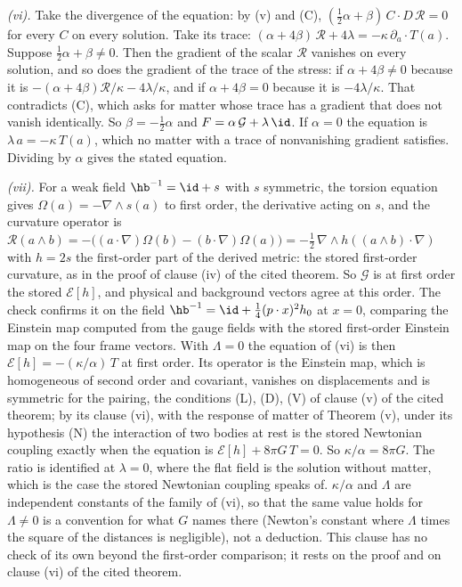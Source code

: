 \emph{(vi).} Take the divergence of the equation: by (v) and (C), $(\tfrac12\alpha + \beta)\,C \cdot D\,\mathcal{R} = 0$ for every $C$ on every solution. Take its trace: $(\alpha + 4\beta)\,\mathcal{R} + 4\lambda = -\kappa\,\partial_{a} \cdot T(a)$. Suppose $\tfrac12\alpha + \beta \neq 0$. Then the gradient of the scalar $\mathcal{R}$ vanishes on every solution, and so does the gradient of the trace of the stress: if $\alpha + 4\beta \neq 0$ because it is $-(\alpha + 4\beta)\mathcal{R}/\kappa - 4\lambda/\kappa$, and if $\alpha + 4\beta = 0$ because it is $-4\lambda/\kappa$. That contradicts (C), which asks for matter whose trace has a gradient that does not vanish identically. So $\beta = -\tfrac12\alpha$ and $F = \alpha\,\mathcal{G} + \lambda\,\id$. If $\alpha = 0$ the equation is $\lambda\,a = -\kappa\,T(a)$, which no matter with a trace of nonvanishing gradient satisfies. Dividing by $\alpha$ gives the stated equation.

\emph{(vii).} For a weak field $\hb^{-1} = \id + s$ with $s$ symmetric, the torsion equation gives $\Omega(a) = -\nabla \wedge s(a)$ to first order, the derivative acting on $s$, and the curvature operator is $\mathcal{R}(a \wedge b) = -\bigl((a \cdot \nabla)\Omega(b) - (b \cdot \nabla)\Omega(a)\bigr) = -\tfrac12\,\nabla \wedge h((a \wedge b) \cdot \nabla)$ with $h = 2s$ the first-order part of the derived metric: the stored first-order curvature, as in the proof of clause (iv) of the cited theorem. So $\mathcal{G}$ is at first order the stored $\mathcal{E}[h]$, and physical and background vectors agree at this order. The check confirms it on the field $\hb^{-1} = \id + \tfrac14(p \cdot x)^{2}h_{0}$ at $x = 0$, comparing the Einstein map computed from the gauge fields with the stored first-order Einstein map on the four frame vectors. With $\Lambda = 0$ the equation of (vi) is then $\mathcal{E}[h] = -(\kappa/\alpha)\,T$ at first order. Its operator is the Einstein map, which is homogeneous of second order and covariant, vanishes on displacements and is symmetric for the pairing, the conditions (L), (D), (V) of clause (v) of the cited theorem; by its clause (vi), with the response of matter of Theorem (v), under its hypothesis (N) the interaction of two bodies at rest is the stored Newtonian coupling exactly when the equation is $\mathcal{E}[h] + 8\pi G\,T = 0$. So $\kappa/\alpha = 8\pi G$. The ratio is identified at $\lambda = 0$, where the flat field is the solution without matter, which is the case the stored Newtonian coupling speaks of. $\kappa/\alpha$ and $\Lambda$ are independent constants of the family of (vi), so that the same value holds for $\Lambda \neq 0$ is a convention for what $G$ names there (Newton's constant where $\Lambda$ times the square of the distances is negligible), not a deduction. This clause has no check of its own beyond the first-order comparison; it rests on the proof and on clause (vi) of the cited theorem.
